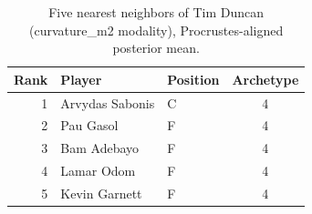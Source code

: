 \begin{table}[htbp]
  \centering\small
  \begin{tabular}{rllc}
    \toprule
    Rank & Player & Position & Archetype \\
    \midrule
    1 & Arvydas Sabonis & C & 4 \\
    2 & Pau Gasol & F & 4 \\
    3 & Bam Adebayo & F & 4 \\
    4 & Lamar Odom & F & 4 \\
    5 & Kevin Garnett & F & 4 \\
    \bottomrule
  \end{tabular}
  \caption{Five nearest neighbors of Tim Duncan (curvature_m2 modality), Procrustes-aligned posterior mean.}
  \label{tab:Tim_Duncan_neighbors_curvature_m2}
\end{table}

